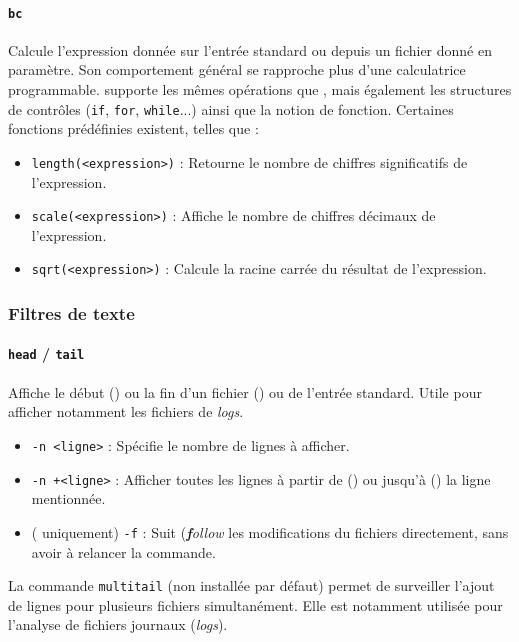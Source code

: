\paragraph{\texttt{bc}} 
Calcule l'expression donnée sur l'entrée standard ou depuis un fichier donné en paramètre. Son comportement général se rapproche plus d'une calculatrice programmable.
 supporte les mêmes opérations que , mais également les structures de contrôles (\texttt{if}, \texttt{for}, \texttt{while}...) ainsi que la notion de fonction.
Certaines fonctions prédéfinies existent, telles que :
\begin{itemize}
    \item \texttt{length(<expression>)} : Retourne le nombre de chiffres significatifs de l'expression.
    \item \texttt{scale(<expression>)} : Affiche le nombre de chiffres décimaux de l'expression.
    \item \texttt{sqrt(<expression>)} : Calcule la racine carrée du résultat de l'expression.
\end{itemize}

\newpage


\subsubsection{Filtres de texte}

\paragraph{\texttt{head} / \texttt{tail}} 
Affiche le début () ou la fin d'un fichier () ou de l'entrée standard. Utile pour afficher notamment les fichiers de \textit{logs}.
\begin{itemize}
    \item \texttt{-n <ligne>} : Spécifie le nombre de lignes à afficher.
    \item \texttt{-n +<ligne>} : Afficher toutes les lignes à partir de () ou jusqu'à () la ligne mentionnée.
    \item ( uniquement) \texttt{-f} : Suit (\textit{\textbf{f}ollow} les modifications du fichiers directement, sans avoir à relancer la commande.
\end{itemize}
 La commande \texttt{multitail} (non installée par défaut) permet de surveiller l'ajout de lignes pour plusieurs fichiers simultanément. Elle est notamment utilisée pour l'analyse de fichiers journaux (\textit{logs}).

